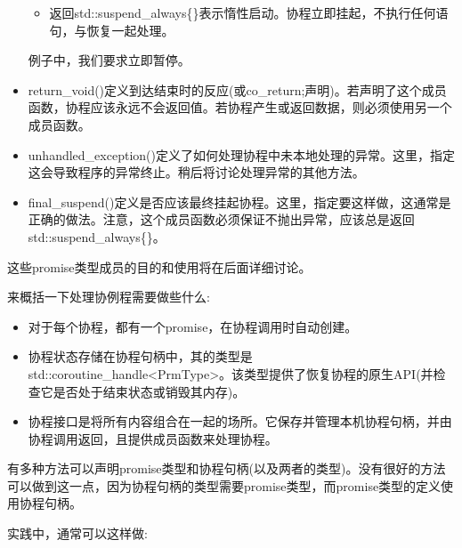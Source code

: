 \begin{itemize}
\begin{itemize}
\item 
返回std::suspend\_always\{\}表示惰性启动。协程立即挂起，不执行任何语句，与恢复一起处理。
\end{itemize}

例子中，我们要求立即暂停。

\item 
return\_void()定义到达结束时的反应(或co\_return;声明)。若声明了这个成员函数，协程应该永远不会返回值。若协程产生或返回数据，则必须使用另一个成员函数。

\item 
unhandled\_exception()定义了如何处理协程中未本地处理的异常。这里，指定这会导致程序的异常终止。稍后将讨论处理异常的其他方法。

\item
final\_suspend()定义是否应该最终挂起协程。这里，指定要这样做，这通常是正确的做法。注意，这个成员函数必须保证不抛出异常，应该总是返回std::suspend\_always\{\}。
\end{itemize}

这些promise类型成员的目的和使用将在后面详细讨论。


来概括一下处理协例程需要做些什么:

\begin{itemize}
\item 
对于每个协程，都有一个promise，在协程调用时自动创建。

\item 
协程状态存储在协程句柄中，其的类型是std::coroutine\_handle<PrmType>。该类型提供了恢复协程的原生API(并检查它是否处于结束状态或销毁其内存)。

\item 
协程接口是将所有内容组合在一起的场所。它保存并管理本机协程句柄，并由协程调用返回，且提供成员函数来处理协程。
\end{itemize}

有多种方法可以声明promise类型和协程句柄(以及两者的类型)。没有很好的方法可以做到这一点，因为协程句柄的类型需要promise类型，而promise类型的定义使用协程句柄。

实践中，通常可以这样做:

